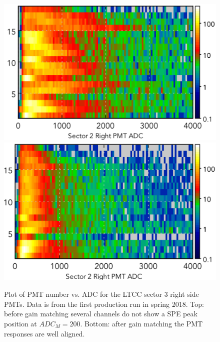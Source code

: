 \begin{figure}[H]
	\centering
	\includegraphics[width=1.05\columnwidth, keepaspectratio]{img/gainMatchingBefore.png}
	\includegraphics[width=1.05\columnwidth, keepaspectratio]{img/gainMatchingAfter.png}
	\caption{Plot of PMT number vs. ADC for the LTCC sector 3 right side PMTs. Data is from the first production
             run in spring 2018. Top: before gain matching several channels do not show a SPE peak position at  $ADC_M = 200$.
             Bottom: after gain matching the PMT responses are well aligned.}
	\label{fig:gainMatching}
\end{figure}

